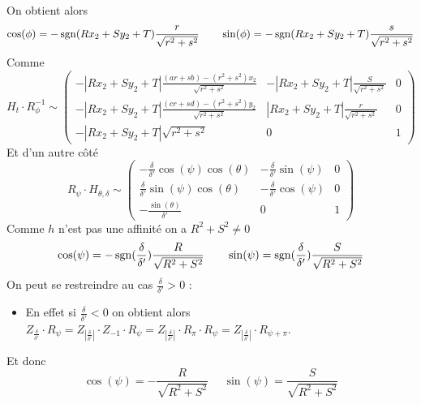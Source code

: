  On obtient alors 
 \begin{equation*}
 \cos( \phi )= -\operatorname{sgn}(R x_2 +S y_2 +T) \frac{r}{\sqrt{r^2 + s^2}}~~~~~~ \sin( \phi )= -\operatorname{sgn}(R x_2 +S y_2 +T) \frac{s}{\sqrt{r^2 + s^2}}
 \end{equation*}
 Comme 
 \begin{equation*}
H_t \cdot R_{\phi}^{-1} \sim
 \begin{pmatrix}
 -|R x_2 +S y_2 +T|\frac{(ar+sb)-(r^2 + s^2)x_2}{\sqrt{r^2 + s^2}}&-|R x_2 +S y_2 +T|\frac{S}{\sqrt{r^2 + s^2}}&0\\
 -|R x_2 +S y_2 +T|\frac{(cr+sd)-(r^2 + s^2)y_2}{\sqrt{r^2 + s^2}}&|R x_2 +S y_2 +T|\frac{r}{\sqrt{r^2 + s^2}}&0\\
 -|R x_2 +S y_2 +T|\sqrt{r^2 + s^2}&0&1
 \end{pmatrix}
 \end{equation*}
 Et d'un autre côté 
 \begin{equation*}
R_{\psi} \cdot H_{\theta,\delta}  \sim 
 \begin{pmatrix}
 -\frac{\delta}{\delta'}\cos(\psi)\cos(\theta)&
-\frac{\delta}{\delta'}\sin(\psi)&
0\\
\frac{\delta}{\delta'}\sin(\psi)\cos(\theta)&
-\frac{\delta}{\delta'}\cos(\psi)&
0\\
-\frac{\sin(\theta)}{\delta'}&
0&
1
 \end{pmatrix}
 \end{equation*}
Comme $h$ n'est pas une affinité on a $R^2 + S^2 \ne 0$ 
 \begin{equation*}
  \cos( \psi ) =- \operatorname{sgn}(\frac{\delta}{\delta'})\frac{R}{\sqrt{R^2 + S^2}}~~~~~~ \sin( \psi ) = \operatorname{sgn}(\frac{\delta}{\delta'})\frac{S}{\sqrt{R^2 + S^2}}
 \end{equation*}
On peut se restreindre au cas $\frac{\delta}{\delta'}>0$ :\\
\begin{itemize}
\item En effet si $\frac{\delta}{\delta'}<0$ on obtient alors $Z_{\frac{\delta}{\delta'}} \cdot R_{\psi}=Z_{\left|\frac{\delta}{\delta'}\right|}\cdot Z_{-1} \cdot R_{\psi}=Z_{\left|\frac{\delta}{\delta'}\right|}\cdot R_{\pi} \cdot R_{\psi}=Z_{\left|\frac{\delta}{\delta'}\right|}\cdot R_{\psi+\pi}$.
\end{itemize}
Et donc 
 \begin{equation*}
  \cos( \psi ) =- \frac{R}{\sqrt{R^2 + S^2}}~~~~~~ \sin( \psi ) = \frac{S}{\sqrt{R^2 + S^2}}
 \end{equation*}



